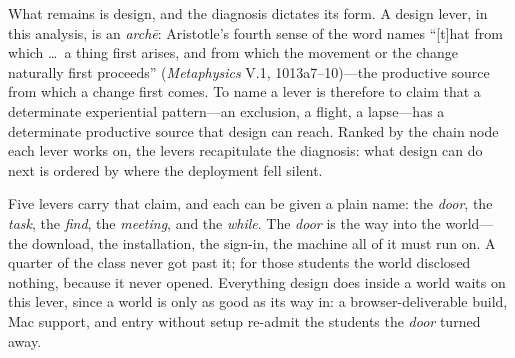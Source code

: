 What remains is design, and the diagnosis dictates its form. A design
lever, in this analysis, is an \textit{archē}: Aristotle's fourth
sense of the word names ``[t]hat from which \ldots\ a thing first
arises, and from which the movement or the change naturally first
proceeds'' (\textit{Metaphysics} V.1, 1013a7--10)---the productive
source from which a change first comes. To name a lever is therefore
to claim that a determinate experiential pattern---an exclusion, a
flight, a lapse---has a determinate productive source that design can
reach. Ranked by the chain node each lever works on, the levers
recapitulate the diagnosis: what design can do next is ordered by
where the deployment fell silent.

Five levers carry that claim, and each can be given a plain name: the
\textit{door}, the \textit{task}, the \textit{find}, the
\textit{meeting}, and the \textit{while}. The \textit{door} is the way
into the world---the download, the installation, the sign-in, the
machine all of it must run on. A quarter of the class never got past
it; for those students the world disclosed nothing, because it never
opened. Everything design does inside a world waits on this lever,
since a world is only as good as its way in: a browser-deliverable
build, Mac support, and entry without setup re-admit the students the
\textit{door} turned away.

